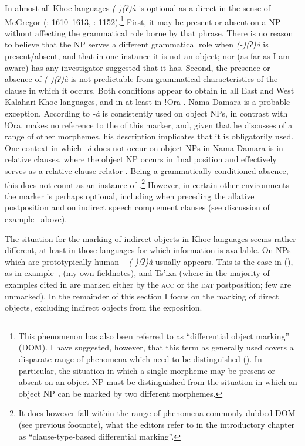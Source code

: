 \documentclass[output=paper]{LSP/langsci}
\begin{document}
In almost all Khoe languages \textit{(-)(ʔ)à} is optional as a direct  in the sense of McGregor (\citeyear{McGregor2010Optional}: 1610–1613, \citeyear{McGregor2013Optionality}: 1152).\footnote{This phenomenon has also been referred to as “differential object marking” (DOM). I have suggested, however, that this term as generally used covers a disparate range of phenomena which need to be distinguished (\eg \citealt[1613]{McGregor2010Optional}). In particular, the situation in which a single morpheme may be present or absent on an object NP must be distinguished from the situation in which an object NP can be marked by two different morphemes.} First, it may be present or absent on a  NP without affecting the grammatical role borne by that phrase. There is no reason to believe that the NP serves a different grammatical role when \textit{(-)(ʔ)à} is present/absent, and that in one instance it is not an object; nor (as far as I am aware) has any investigator suggested that it has. Second, the presence or absence of \textit{(-)(ʔ)à} is not predictable from grammatical characteristics of the clause in which it occurs. Both conditions appear to obtain in all East and West Kalahari Khoe languages, and in  at least in ǃOra \citep[341]{Haacke2013Gora}. Nama-Damara is a probable exception. According to \citet[341]{Haacke2013Gora} \textit{-à} is consistently used on object NPs, in contrast with !Ora. \citet{Hagman1973Nama} makes no reference to the  of this marker, and, given that he discusses  of a range of other morphemes, his description implicates that it is obligatorily used. One context in which \textit{-à} does not occur on object NPs in Nama-Damara is in relative clauses, where the object NP occurs in final position and effectively serves as a relative clause relator \citep[230–231]{Hagman1973Nama}. Being a grammatically conditioned absence, this does not count as an instance of .\footnote{It does however fall within the range of phenomena commonly dubbed DOM (see previous footnote), what the editors refer to in the introductory chapter as “clause-type-based differential marking”.} However, in certain other environments the marker is perhaps optional, including when preceding the allative postposition and on indirect speech complement clauses (see discussion of example~ above).

The situation for the marking of indirect objects in Khoe languages seems rather different, at least in those languages for which information is available. On  NPs – which are prototypically human – \textit{(-)(ʔ)à} usually appears. This is the case in  (\citealt[51, 56, 63]{Kilian-Hatz2008Grammar}), as in example~,  (my own fieldnotes), and Ts’ixa (where in the majority of examples cited in \citealt{Fehn2014Grammar} are marked either by the \textsc{acc} or the \textsc{dat} postposition; few are unmarked). In the remainder of this section I focus on the marking of direct objects, excluding indirect objects from the exposition.
\end{document}
